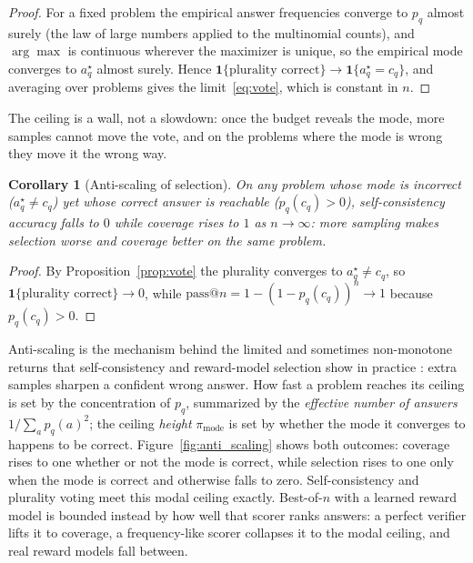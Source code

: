 \documentclass[11pt]{article}
\newtheorem{corollary}{Corollary}
\begin{document}
\begin{proof}
For a fixed problem the empirical answer frequencies converge to $p_q$ almost surely (the law of large numbers applied to the multinomial counts), and $\arg\max$ is continuous wherever the maximizer is unique, so the empirical mode converges to $a^\star_q$ almost surely. Hence $\mathbf 1\{\text{plurality correct}\}\to\mathbf 1\{a^\star_q=c_q\}$, and averaging over problems gives the limit~\eqref{eq:vote}, which is constant in $n$.
\end{proof}

The ceiling is a wall, not a slowdown: once the budget reveals the mode, more samples cannot move the vote, and on the problems where the mode is wrong they move it the wrong way.

\begin{corollary}[Anti-scaling of selection]
\label{cor:antiscale}
On any problem whose mode is incorrect ($a^\star_q \ne c_q$) yet whose correct answer is reachable ($p_q(c_q)>0$), self-consistency accuracy falls to $0$ while coverage rises to $1$ as $n\to\infty$: more sampling makes selection worse and coverage better on the same problem.
\end{corollary}

\begin{proof}
By Proposition~\ref{prop:vote} the plurality converges to $a^\star_q\ne c_q$, so $\mathbf 1\{\text{plurality correct}\}\to0$, while $\mathrm{pass}@n = 1-(1-p_q(c_q))^n\to1$ because $p_q(c_q)>0$.
\end{proof}

Anti-scaling is the mechanism behind the limited and sometimes non-monotone returns that self-consistency and reward-model selection show in practice \citep{chen2024morecalls,wang2025diversity}: extra samples sharpen a confident wrong answer. How fast a problem reaches its ceiling is set by the concentration of $p_q$, summarized by the \emph{effective number of answers} $1/\sum_a p_q(a)^2$; the ceiling \emph{height} $\pi_{\mathrm{mode}}$ is set by whether the mode it converges to happens to be correct. Figure~\ref{fig:anti_scaling} shows both outcomes: coverage rises to one whether or not the mode is correct, while selection rises to one only when the mode is correct and otherwise falls to zero. Self-consistency and plurality voting meet this modal ceiling exactly. Best-of-$n$ with a learned reward model is bounded instead by how well that scorer ranks answers: a perfect verifier lifts it to coverage, a frequency-like scorer collapses it to the modal ceiling, and real reward models fall between.
\end{document}
